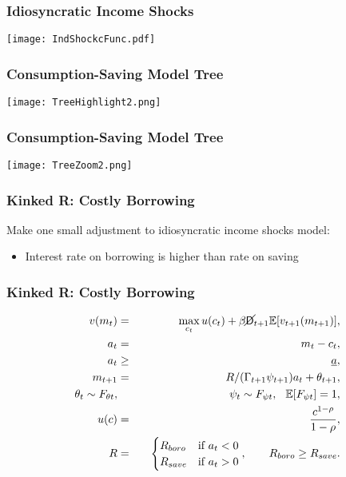 \documentclass[11pt]{cfpbpresentation}
\newcommand{\E}{\mathbb{E}}
\newcommand{\Die}{\mathsf{D}}
\newcommand{\Live}{\cancel{\Die}}
\begin{document}
\begin{frame}
\frametitle{Idiosyncratic Income Shocks}
\begin{center}
\texttt{[image: IndShockcFunc.pdf]}
\end{center}
\end{frame}

\begin{frame}
\frametitle{Consumption-Saving Model Tree}
\begin{center}
\texttt{[image: TreeHighlight2.png]}
\end{center}
\end{frame}

\begin{frame}
\frametitle{Consumption-Saving Model Tree}
\begin{center}
\texttt{[image: TreeZoom2.png]}
\end{center}
\end{frame}


\begin{frame}
\frametitle{Kinked R: Costly Borrowing}
Make one small adjustment to idiosyncratic income shocks model:
\begin{itemize}
\item Interest rate on borrowing is higher than rate on saving
\end{itemize}
\end{frame}


\begin{frame}
\frametitle{Kinked R: Costly Borrowing}
\begin{eqnarray*}
v(m_t) &=& \max_{c_t} u(c_t) + \beta \Live_{t+1} \E [v_{t+1}(m_{t+1}) ], \\
a_t &=& m_t - c_t, \\
a_t &\geq& \underline{a}, \\
m_{t+1} &=& R/(\Gamma_{t+1} \psi_{t+1}) a_t + \theta_{t+1}, \\
\theta_t \sim F_{\theta t}, &\qquad& \psi_t \sim F_{\psi t}, \hspace{0.25cm} \E[F_{\psi t}] = 1, \\
u(c) &=& \frac{c^{1-\rho}}{1-\rho}, \\
R &=& \begin{cases}
R_{boro} & \text{if  } a_t < 0 \\
R_{save} & \text{if  } a_t > 0
\end{cases}, \qquad R_{boro} \geq R_{save}.
\end{eqnarray*}
\end{frame}
\end{document}
